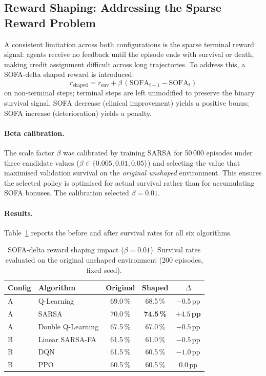 \documentclass[11pt,a4paper]{article}
\begin{document}
\subsection{Reward Shaping: Addressing the Sparse Reward Problem}
\label{sec:shaping}

A consistent limitation across both configurations is the sparse terminal reward
signal: agents receive no feedback until the episode ends with survival or death,
making credit assignment difficult across long trajectories.
To address this, a SOFA-delta shaped reward is introduced:
\[
  r_{\text{shaped}} = r_{\text{env}} + \beta\,(\text{SOFA}_{t-1} - \text{SOFA}_t)
\]
on non-terminal steps; terminal steps are left unmodified to preserve the binary
survival signal. SOFA decrease (clinical improvement) yields a positive bonus;
SOFA increase (deterioration) yields a penalty.

\paragraph{Beta calibration.}
The scale factor $\beta$ was calibrated by training SARSA for 50\,000 episodes
under three candidate values ($\beta \in \{0.005, 0.01, 0.05\}$) and selecting
the value that maximised validation survival on the \emph{original unshaped}
environment. This ensures the selected policy is optimised for actual survival
rather than for accumulating SOFA bonuses. The calibration selected $\beta = 0.01$.

\paragraph{Results.}
Table~\ref{tab:shaping} reports the before and after survival rates for all six
algorithms.

\begin{table}[H]
\centering\small
\caption{SOFA-delta reward shaping impact ($\beta=0.01$). Survival rates
         evaluated on the original unshaped environment (200 episodes, fixed seed).}
\label{tab:shaping}
\begin{tabular}{llccc}
\toprule
Config & Algorithm & Original & Shaped & $\Delta$ \\
\midrule
A & Q-Learning        & 69.0\,\% & 68.5\,\% & $-0.5$\,pp \\
A & SARSA             & 70.0\,\% & \textbf{74.5\,\%} & $\mathbf{+4.5}$\,\textbf{pp} \\
A & Double Q-Learning & 67.5\,\% & 67.0\,\% & $-0.5$\,pp \\
\midrule
B & Linear SARSA-FA   & 61.5\,\% & 61.0\,\% & $-0.5$\,pp \\
B & DQN               & 61.5\,\% & 60.5\,\% & $-1.0$\,pp \\
B & PPO               & 60.5\,\% & 60.5\,\% & $0.0$\,pp \\
\bottomrule
\end{tabular}
\end{table}
\end{document}
